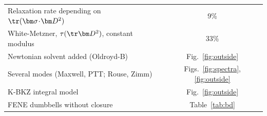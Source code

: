 \begin{table}
\begin{ruledtabular}
\begin{tabular}{lc}
Relaxation rate depending on $\tr(\bm\sigma\!\cdot\!\bm D^2)$ & 9\%\\
White-Metzner, $\tau(\tr\bm D^2)$, constant modulus & 33\%\\
Newtonian solvent added (Oldroyd-B) & Fig.~\ref{fig:outside}\\
Several modes (Maxwell, PTT; Rouse, Zimm) & Figs.~\ref{fig:spectra}, \ref{fig:outside}\\
K-BKZ integral model & Fig.~\ref{fig:outside}\\
FENE dumbbells without closure & Table~\ref{tab:bd}\\
\end{tabular}
\end{ruledtabular}
\end{table}
